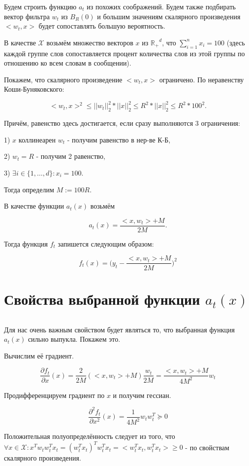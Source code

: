 \documentclass[12pt]{article}
\begin{document}
Будем строить функцию $a_t$ из похожих соображений. Будем также подбирать вектор фильтра $w_t$ из $B_R(0)$ и большим значениям скалярного произведения $<w_t, x>$ будет сопоставлять большую вероятность.

В качестве $\mathcal{X}$ возьмём множество векторов $x$ из $\mathbb{R_{+}}^d$, что $\sum\limits_{i=1}^n x_i = 100$ (здесь каждой группе слов сопоставляется процент количества слов из этой группы по отношению ко всем словам в сообщении).

Покажем, что скалярного произведение $<w_t, x>$ ограничено. По неравенству Коши-Буняковского:

$$<w_t, x>^2 \leq ||w_t||_2^2*||x||_2^2 \leq R^2*||x||_2^2 \leq R^2*100^2.$$

Причём, равенство здесь достигается, если сразу выполняются 3 ограничения:

1) $x$ коллинеарен $w_t$ - получим равенство в нер-ве К-Б,

2) $w_t=R$ - получим 2 равенство,

3) $\exists i \in \{1, \dots, d\}: x_i = 100$.

Тогда определим $M := 100R$.

В качестве функции $a_t(x)$ возьмём

 $$a_t(x) = \frac{<x, w_t>+M}{2M}.$$
 
 Тогда функция $f_t$ запишется следующим образом:
 
 $$f_t(x) = \bigg(y_t - \frac{<x, w_t>+M}{2M}\bigg)^2$$
 
\section*{Свойства выбранной функции $a_t(x)$}
$ $

Для нас очень важным свойством будет являться то, что выбранная функция $a_t(x)$ сильно выпукла. Покажем это.

Вычислим её градиент.

$$\frac{\partial f_t}{\partial x}(x) = \frac{2}{2M}(<x, w_t>+M)\frac{w_t}{2M} = \frac{<x, w_t>+M}{4M^2}w_t$$

Продифференцируем градиент по $x$ и получим гессиан.

$$\frac{\partial^2 f_t}{\partial x^2}(x) = \frac{1}{4M^2}w_tw_t^T \succeq 0$$

Положительная полуопределённость следует из того, что $\forall x \in \mathcal{X}: x^Tw_tw_t^Tx_t = (w_t^Tx_t)^Tw_t^Tx_t = <w_t^Tx_t, w_t^Tx_t> \geq 0$ - по свойствам скалярного произведения.
\end{document}
